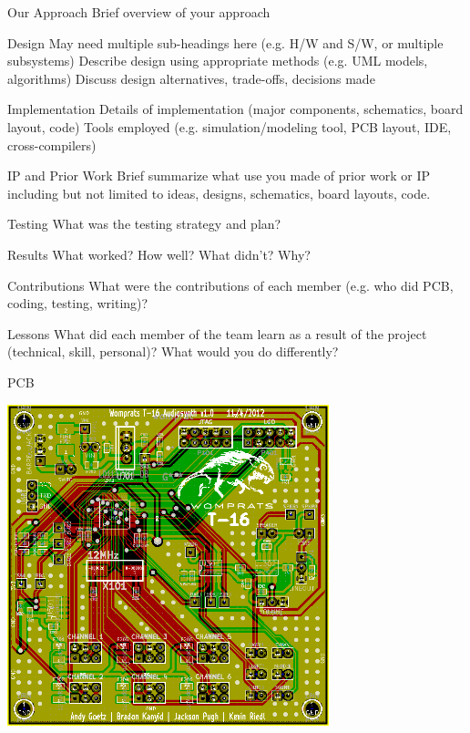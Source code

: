 \documentclass{beamer}
\begin{document}
\begin{frame}{Our Approach}
Brief overview of your approach
\end{frame}

\begin{frame}{Design}
May need multiple sub-headings here (e.g.  H/W and S/W, or multiple
subsystems) Describe design using appropriate methods (e.g.  UML
models, algorithms) Discuss design alternatives, trade-offs, decisions
made
\end{frame}

\begin{frame}{Implementation}
Details of implementation (major components, schematics, board layout,
code)	  
Tools employed (e.g.  simulation/modeling tool, PCB layout, IDE,
cross-compilers)
\end{frame}

\begin{frame}{IP and Prior Work}
Brief summarize what use you made of prior work or IP including but
not limited to ideas, designs, schematics, board layouts, code.
\end{frame}

\begin{frame}{Testing}
What was the testing strategy and plan?  
\end{frame}

\begin{frame}{Results}
What worked? How well? What didn't? Why?
  
\end{frame}

\begin{frame}{Contributions}
What were the contributions of each member (e.g.  who did PCB, coding,
testing, writing)?
  
\end{frame}
\begin{frame}{Lessons}
What did each member of the team learn as a result of the project
(technical, skill, personal)?  What would you do differently?
\end{frame}

\begin{frame}{PCB}
\begin{center}
 \includegraphics[width=0.7\textwidth]{pcb.png}
\end{center}
\end{frame}
\end{document}
